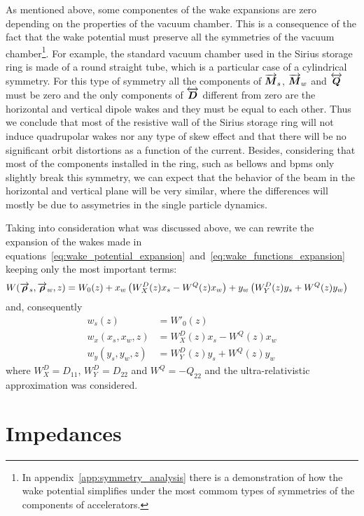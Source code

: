 \documentclass[
	12pt,				%
	openright,			%
	oneside,			%
	a4paper,		%
	chapter=TITLE,		%
	section=TITLE,		%
    brazil,				%
	english,			%
	sumario=tradicional,
	]{abntex2}
\begin{document}
  As mentioned above, some componentes of the wake expansions are zero depending on the properties of the vacuum chamber. This is a consequence of the fact that the wake potential must preserve all the symmetries of the vacuum chamber\footnote{In appendix~\ref{app:symmetry_analysis} there is a demonstration of how the wake potential simplifies under the most commom types of symmetries of the components of accelerators.}. For example, the standard vacuum chamber used in the Sirius storage ring is made of a round straight tube, which is a particular case of a cylindrical symmetry. For this type of symmetry all the components of $\overrightarrow{\boldsymbol{M}}_s$, $\overrightarrow{\boldsymbol{M}}_w$ and $\overleftrightarrow{\boldsymbol{Q}}$ must be zero and the only components of $\overleftrightarrow{\boldsymbol{D}}$ different from zero are the horizontal and vertical dipole wakes and they must be equal to each other. Thus we conclude that most of the resistive wall of the Sirius storage ring will not induce quadrupolar wakes nor any type of skew effect and that there will be no significant orbit distortions as a function of the current. Besides, considering that most of the components installed in the ring, such as bellows and \gls{bpms} only slightly break this symmetry, we can expect that the behavior of the beam in the horizontal and vertical plane will be very similar, where the differences will mostly be due to assymetries in the single particle dynamics.

  Taking into consideration what was discussed above, we can rewrite the expansion of the wakes made in equations~\eqref{eq:wake_potential_expansion}~and~\eqref{eq:wake_functions_expansion} keeping only the most important terms:
  \begin{align}\label{eq:important_wake_potential}
  	  W(\overrightarrow{\boldsymbol{\rho}}_s, \overrightarrow{\boldsymbol{\rho}}_w, z) &=
	  	W_0(z) +
		x_w\left(W^D_X(z)x_s - W^Q(z)x_w\right) +
		y_w\left(W^D_Y(z)y_s + W^Q(z)y_w\right)
  \end{align}
  and, consequently
  \begin{align}\label{eq:important_wakes}\nonumber
  	w_s(z) &= W'_0(z) \\
	w_x(x_s, x_w, z) &= W^D_X(z)x_s - W^Q(z)x_w \\\nonumber
	w_y(y_s, y_w, z) &= W^D_Y(z)y_s + W^Q(z)y_w
  \end{align}
  where $W^D_X = D_{11}$, $W^D_Y = D_{22}$ and $W^Q = -Q_{22}$ and the ultra-relativistic approximation was considered.

  \section{Impedances}\label{sec:wake_functions}
\end{document}
